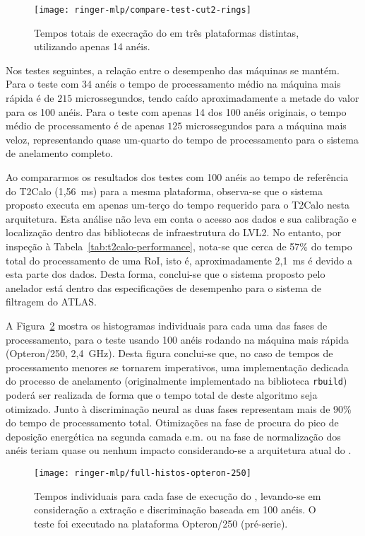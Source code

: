 \begin{figure}
\begin{center}
\texttt{[image: ringer-mlp/compare-test-cut2-rings]}
\end{center}
\caption{Tempos totais de execração do  em três plataformas
distintas, utilizando apenas 14 anéis.}
\label{fig:timings-histo-cut2}
\end{figure}

Nos testes seguintes, a relação entre o desempenho das máquinas se
mantém. Para o teste com 34 anéis o tempo de processamento médio na máquina
mais rápida é de $215$ microssegundos, tendo caído aproximadamente a metade do
valor para os 100 anéis. Para o teste com apenas 14 dos 100 anéis originais, o
tempo médio de processamento é de apenas $125$ microssegundos para a máquina
mais veloz, representando quase um-quarto do tempo de processamento para o
sistema de anelamento completo.

Ao compararmos os resultados dos testes com 100 anéis ao tempo de referência
do T2Calo (1,56~ms) para a mesma plataforma, observa-se que o sistema proposto
executa em apenas um-terço do tempo requerido para o T2Calo nesta
arquitetura. Esta análise não leva em conta o acesso aos dados e sua
calibração e localização dentro das bibliotecas de infraestrutura do LVL2. No
entanto, por inspeção à Tabela~\ref{tab:t2calo-performance}, nota-se que cerca
de 57\% do tempo total do processamento de uma RoI, isto é, aproximadamente
2,1~ms é devido a esta parte dos dados. Desta forma, conclui-se que o sistema
proposto pelo anelador está dentro das especificações de desempenho para o
sistema de filtragem do ATLAS.

A Figura~\ref{fig:p1-full-histos} mostra os histogramas individuais para cada
uma das fases de processamento, para o teste usando 100 anéis rodando na
máquina mais rápida (Opteron/250, 2,4~GHz). Desta figura conclui-se que, no
caso de tempos de processamento menores se tornarem imperativos, uma
implementação dedicada do processo de anelamento (originalmente implementado
na biblioteca \texttt{rbuild}) poderá ser realizada de forma que o tempo total
de deste algoritmo seja otimizado. Junto à discriminação neural as duas fases
representam mais de 90\% do tempo de processamento total. Otimizações na fase
de procura do pico de deposição energética na segunda camada e.m. ou na fase
de normalização dos anéis teriam quase ou nenhum impacto considerando-se a
arquitetura atual do .

\begin{figure}
\begin{center}
\texttt{[image: ringer-mlp/full-histos-opteron-250]}
\end{center}
\caption{Tempos individuais para cada fase de execução do ,
levando-se em consideração a extração e discriminação baseada em 100 anéis. O
teste foi executado na plataforma Opteron/250 (pré-serie).}
\label{fig:p1-full-histos}
\end{figure}

